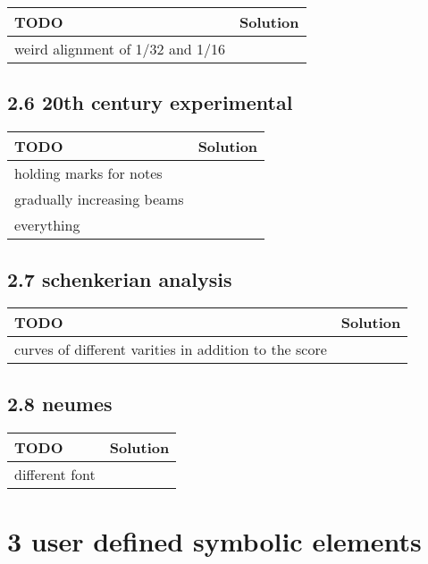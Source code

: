  \begin{tabular}{|p{}|p{}|}
 \hline
 \textbf{TODO} &
 \textbf{Solution} 
\\
 \hline
	weird alignment of 1/32 and 1/16 &
  
\\ 	\hline
 \end{tabular} \subsection*{2.6 20th century experimental}
 \begin{tabular}{|p{}|p{}|}
 \hline
 \textbf{TODO} &
 \textbf{Solution} 
\\
 \hline
	holding marks for notes &
  
\\ 	\hline
	gradually increasing beams &
  
\\ 	\hline
	everything &
  
\\ 	\hline
 \end{tabular} \subsection*{2.7 schenkerian analysis}
 \begin{tabular}{|p{}|p{}|}
 \hline
 \textbf{TODO} &
 \textbf{Solution} 
\\
 \hline
	curves of different varities in addition to the score &
  
\\ 	\hline
 \end{tabular} \subsection*{2.8 neumes}
 \begin{tabular}{|p{}|p{}|}
 \hline
 \textbf{TODO} &
 \textbf{Solution} 
\\
 \hline
	different font &
  
\\ 	\hline
 \end{tabular} \section*{3 user defined symbolic elements}
